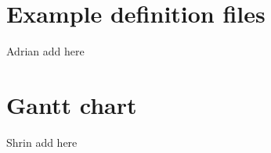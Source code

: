 \documentclass[a4paper,11pt]{article}
\numberwithin{equation}{section}
\begin{document}
\section{Example definition files}
Adrian add here

\begin{appendices} \label{app}
	\section{Gantt chart}
	Shrin add here
\end{appendices}
\end{document}
